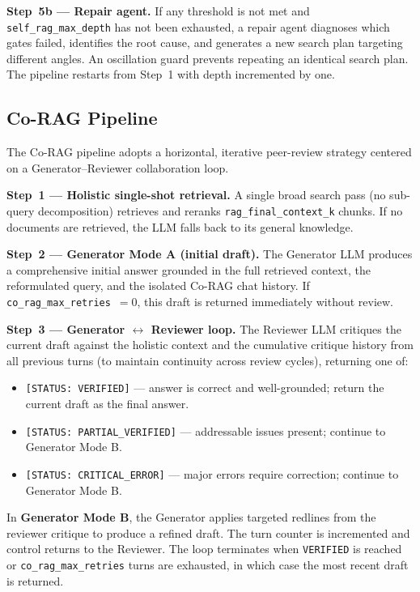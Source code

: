 \documentclass[10pt, conference, a4paper, compsocconf]{IEEEtran}
\begin{document}
\textbf{Step~5b — Repair agent.} If any threshold is not met and
\texttt{self\_rag\_max\_depth} has not been exhausted, a repair agent
diagnoses which gates failed, identifies the root cause, and generates a
new search plan targeting different angles. An oscillation guard prevents
repeating an identical search plan. The pipeline restarts from Step~1
with depth incremented by one.

\subsection{Co-RAG Pipeline}

The Co-RAG pipeline adopts a horizontal, iterative peer-review strategy
centered on a Generator--Reviewer collaboration loop.

\textbf{Step~1 — Holistic single-shot retrieval.} A single broad
search pass (no sub-query decomposition) retrieves and reranks
\texttt{rag\_final\_context\_k} chunks. If no documents are retrieved,
the LLM falls back to its general knowledge.

\textbf{Step~2 — Generator Mode A (initial draft).} The Generator LLM
produces a comprehensive initial answer grounded in the full retrieved
context, the reformulated query, and the isolated Co-RAG chat history.
If \texttt{co\_rag\_max\_retries}~$= 0$, this draft is returned
immediately without review.

\textbf{Step~3 — Generator $\leftrightarrow$ Reviewer loop.} The
Reviewer LLM critiques the current draft against the holistic context
and the cumulative critique history from all previous turns (to maintain
continuity across review cycles), returning one of:
\begin{itemize}
  \item \texttt{[STATUS: VERIFIED]} — answer is correct and well-grounded;
        return the current draft as the final answer.
  \item \texttt{[STATUS: PARTIAL\_VERIFIED]} — addressable issues present;
        continue to Generator Mode B.
  \item \texttt{[STATUS: CRITICAL\_ERROR]} — major errors require
        correction; continue to Generator Mode B.
\end{itemize}
In \textbf{Generator Mode B}, the Generator applies targeted redlines
from the reviewer critique to produce a refined draft. The turn counter
is incremented and control returns to the Reviewer. The loop terminates
when \texttt{VERIFIED} is reached or \texttt{co\_rag\_max\_retries} turns
are exhausted, in which case the most recent draft is returned.
\end{document}
